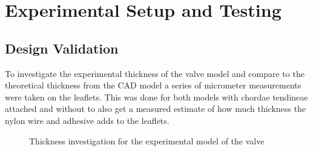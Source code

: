 \chapter{Experimental Setup and Testing}\label{ch:testing}

\section{Design Validation}
To investigate the experimental thickness of the valve model and compare to the theoretical thickness from the \gls{CAD} model a series of micrometer measurements were taken on the leaflets. This was done for both models with chordae tendineae attached and without to also get a measured estimate of how much thickness the nylon wire and adhesive adds to the leaflets.

\begin{figure}[H]
    \centering

    \caption{Thickness investigation for the experimental model of the valve}
    \label{fig:ctinvestigation}
\end{figure}

